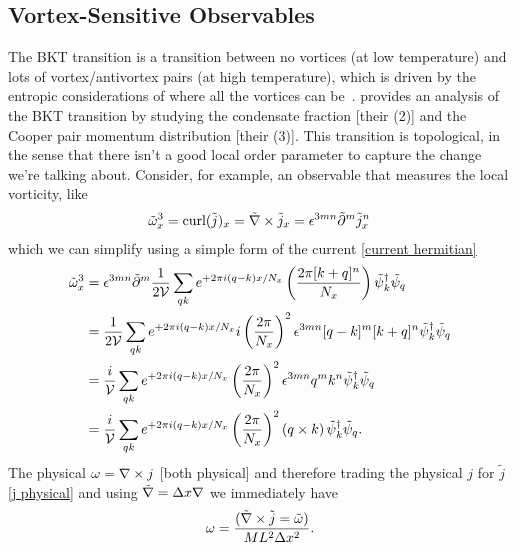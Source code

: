 \subsection{Vortex-Sensitive Observables}\label{sec:vortex}

The BKT transition is a transition between no vortices (at low temperature) and lots of vortex/antivortex pairs (at high temperature), which is driven by the entropic considerations of where all the vortices can be~\cite{1971JETP...32..493B,1972JETP...34..610B,Kosterlitz:1973}.
 provides an analysis of the BKT transition by studying the condensate fraction [their (2)] and the Cooper pair momentum distribution [their (3)].
This transition is topological, in the sense that there isn't a good local order parameter to capture the change we're talking about.
Consider, for example, an observable that measures the local vorticity, like
\begin{align}
	\tilde{\omega}^3_x = \text{curl}(\tilde{j})_x = \tilde{\nabla} \times \tilde{j}_x = \epsilon^{3mn} \tilde{\partial}^m \tilde{j}^n_x
\end{align}
which we can simplify using a simple form of the current \eqref{current hermitian}
\begin{align}
	\tilde{\omega}^3_x
	&=
	\epsilon^{3mn} \tilde{\partial}^m \frac{1}{2\mathcal{V}}
	\sum_{qk} e^{+2\pi i (q-k) x / N_x} \left(\frac{2\pi [ k+q ]^n}{N_x}\right)
	\tilde{\psi}{}^{\dagger}_{k} \tilde{\psi}_{q}
	\nonumber\\
	&=
	\frac{1}{2\mathcal{V}}
	\sum_{qk} e^{+2\pi i (q-k) x / N_x} i \left(\frac{2\pi}{N_x}\right)^2 \epsilon^{3mn} [q-k]^m[ k+q ]^n
	\tilde{\psi}{}^{\dagger}_{k} \tilde{\psi}_{q}
	\nonumber\\
	&=
	\frac{i}{\mathcal{V}}
	\sum_{qk} e^{+2\pi i (q-k) x / N_x} \left(\frac{2\pi}{N_x}\right)^2 \epsilon^{3mn} q^m k^n
	\tilde{\psi}{}^{\dagger}_{k} \tilde{\psi}_{q}
	\nonumber\\
	&=
	\frac{i}{\mathcal{V}}
	\sum_{qk} e^{+2\pi i (q-k) x / N_x} \left(\frac{2\pi}{N_x}\right)^2 (q \times k)\,
	\tilde{\psi}{}^{\dagger}_{k} \tilde{\psi}_{q}.
	\label{eq:vorticity}
\end{align}
The physical $\omega = \nabla \times j$ [both physical] and therefore trading the physical $j$ for $\tilde{j}$ \eqref{j physical} and using $\tilde{\nabla} = \Delta x \nabla$ we immediately have
\begin{align}
	\omega = \frac{(\tilde{\nabla} \times \tilde{j} = \tilde{\omega})}{ML^2 \Delta x^2}.
	\label{eq:omega physical}
\end{align}

